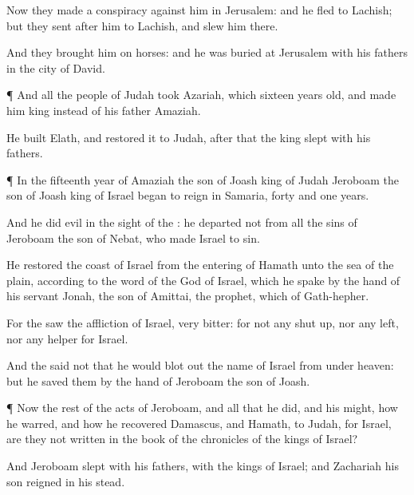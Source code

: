 {Now they
made a
conspiracy against him in
Jerusalem: and he
fled to
Lachish; but they
sent
after him to
Lachish, and
slew him there.

And they
brought him on
horses: and he was
buried at
Jerusalem with his
fathers in the
city of
David.


\par }{\PP {}¶ And all the
people of
Judah
took
Azariah, which
{}
sixteen
years
old, and made him
king instead of his
father
Amaziah.

He
built
Elath, and
restored it to
Judah,
after that the
king
slept with his
fathers.


\par }{\PP {}¶ In the
fifteenth
year of
Amaziah the
son of
Joash
king of
Judah
Jeroboam the
son of
Joash
king of
Israel began to
reign in
Samaria,
{}
forty and
one
years.

And he
did
{}
evil in the
sight of the
{}: he
departed not from all the
sins of
Jeroboam the
son of
Nebat, who made
Israel to
sin.

He
restored the
coast of
Israel from the
entering of
Hamath unto the
sea of the
plain, according to the
word of the
{}
God of
Israel, which he
spake by the
hand of his
servant
Jonah, the
son of
Amittai, the
prophet, which
{} of
Gath-hepher.

For the
{}
saw the
affliction of
Israel,
{}
very
bitter: for
{}
not any shut
up, nor any
left, nor any
helper for
Israel.

And the
{}
said not that he would blot
out the
name of
Israel from under
heaven: but he
saved them by the
hand of
Jeroboam the
son of
Joash.


\par }{\PP {}¶ Now the
rest of the
acts of
Jeroboam, and all that he
did, and his
might, how he
warred, and how he
recovered
Damascus, and
Hamath,
{} to
Judah, for
Israel, are they not
written in the
book of the
chronicles of the
kings of
Israel?

And
Jeroboam
slept with his
fathers,
{} with the
kings of
Israel; and
Zachariah his
son
reigned in his stead.




\par }
